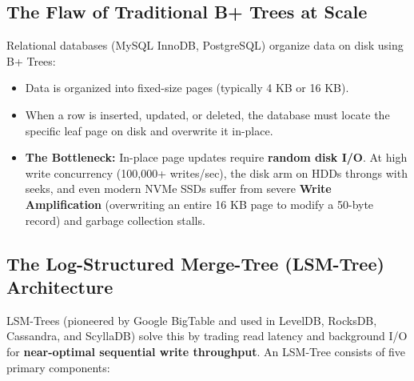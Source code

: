 \documentclass[10pt,journal,compsoc,onecolumn]{IEEEtran}
\begin{document}
\subsection{The Flaw of Traditional B+ Trees at Scale}
Relational databases (MySQL InnoDB, PostgreSQL) organize data on disk using B+ Trees:
\begin{itemize}
    \item Data is organized into fixed-size pages (typically 4 KB or 16 KB).
    \item When a row is inserted, updated, or deleted, the database must locate the specific leaf page on disk and overwrite it in-place.
    \item \textbf{The Bottleneck:} In-place page updates require \textbf{random disk I/O}. At high write concurrency (100,000+ writes/sec), the disk arm on HDDs throngs with seeks, and even modern NVMe SSDs suffer from severe \textbf{Write Amplification} (overwriting an entire 16 KB page to modify a 50-byte record) and garbage collection stalls.
\end{itemize}

\subsection{The Log-Structured Merge-Tree (LSM-Tree) Architecture}
LSM-Trees (pioneered by Google BigTable and used in LevelDB, RocksDB, Cassandra, and ScyllaDB) solve this by trading read latency and background I/O for \textbf{near-optimal sequential write throughput}. An LSM-Tree consists of five primary components:
\end{document}
